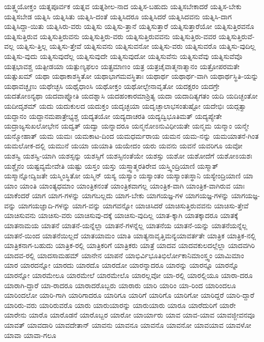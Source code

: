 {ಯತ್ತ್ವಯೋಕ್ತಂ
ಯತ್ನಪೂರ್ವಕ
ಯತ್ನವ
ಯತ್ನಶೀಲ-ನಾದ
ಯತ್ನಿಸ-ಬಹುದು
ಯತ್ನಿಸಬೇಕಾದರೆ
ಯತ್ನಿಸ-ಬೇಕು
ಯತ್ನಿಸಬೇಡ
ಯತ್ನಿಸಿ
ಯತ್ನಿಸಿತು
ಯತ್ನಿಸಿ-ದಂತೆ
ಯತ್ನಿಸಿದರೂ
ಯತ್ನಿಸಿದರೆ
ಯತ್ನಿಸಿದವನು
ಯತ್ನಿಸಿ-ದಾಗ
ಯತ್ನಿಸಿದ್ದಾ-ಯಿತು
ಯತ್ನಿಸಿರು-ವರು
ಯತ್ನಿಸು
ಯತ್ನಿಸು-ತ್ತಾನೆ
ಯತ್ನಿಸುತ್ತಾರೆ
ಯತ್ನಿಸುತ್ತಾರೆಯೋ
ಯತ್ನಿಸುತ್ತಿರವನೊ
ಯತ್ನಿಸುತ್ತಿರುವ
ಯತ್ನಿಸುತ್ತಿರುವನು
ಯತ್ನಿಸುತ್ತಿರು-ವರು
ಯತ್ನಿಸುತ್ತಿರುವವನು
ಯತ್ನಿಸುತ್ತಿರು-ವವರ
ಯತ್ನಿಸುತ್ತಿರುವೆ-ವಲ್ಲ
ಯತ್ನಿಸು-ತ್ತಿಲ್ಲ
ಯತ್ನಿಸು-ತ್ತೇವೆ
ಯತ್ನಿಸುವನು
ಯತ್ನಿಸುವನೋ
ಯತ್ನಿಸು-ವರು
ಯತ್ನಿಸುವರೊ
ಯತ್ನಿಸು-ವುದಿಲ್ಲ
ಯತ್ನಿಸು-ವುದು
ಯತ್ನಿಸುವುದೆಲ್ಲ
ಯತ್ನಿಸುವುದೇ
ಯತ್ನಿಸುವುದೋ
ಯತ್ನಿಸುವೆನು
ಯತ್ನಿಸುವೆವು
ಯತ್ನಿಸುವೆವೊ
ಯತ್ಪಭಾವಶ್ಚ
ಯತ್ಪೀಡಯಾ
ಯತ್ಪುಣ್ಯಫಲಂ
ಯತ್ಪ್ರಮಾಣಂ
ಯತ್ರ
ಯತ್ರಚೈವಾತ್ಮನಾತ್ಮಾನಂ
ಯತ್ರೋಪರಮತೇ
ಯತ್ಸುಖಮ್
ಯಥಾ
ಯಥಾಕಾಶಸ್ಥಿತೋ
ಯಥಾಭಾಗಮವಸ್ಥಿತಾಃ
ಯಥಾರ್ಥ
ಯಥಾರ್ಥ-ವಾಗಿ
ಯಥಾರ್ಥಸ್ಥಿತಿ-ಯನ್ನು
ಯಥಾವಚ್ಛೃಣು
ಯಥೇಚ್ಛಸಿ
ಯಥೈಧಾಂಸಿ
ಯಥೋಕ್ತಂ
ಯಥೋಲ್ಬೇನಾವೃತೋ
ಯದಕ್ಷರಂ
ಯದಗ್ರೇ
ಯದತೋಽನ್ಯಥಾ
ಯದವಾಪ್ನೋತಿ
ಯದಶ್ನಾಸಿ
ಯದಹಂಕಾರಮಾಶ್ರಿತ್ಯ
ಯದಾ
ಯದಾದಿತ್ಯಗತಂ
ಯದಿ
ಯದಿಚ್ಛಂತೋ
ಯದೀದೃಶಮ್
ಯದು
ಯದುಕುಲದ
ಯದುಕ್ತಂ
ಯದೃಚ್ಛಯಾ
ಯದೃಚ್ಛಾಲಾಭಸಂತುಷ್ಟೋ
ಯದೇಭಿಃ
ಯದ್ಗತ್ವಾ
ಯದ್ದಾನಂ
ಯದ್ದಾನಮಪಾತ್ರೇಭ್ಯಶ್ಚ
ಯದ್ಯತಯೋ
ಯದ್ಯದಾಚರತಿ
ಯದ್ಯದ್ವಿಭೂತಿಮತ್
ಯದ್ಯಪ್ಯೇತೇ
ಯದ್ರಾಜ್ಯಸುಖಲೋಭೇನ
ಯದ್ವತ್
ಯದ್ವಾ
ಯನ್ನಾದರೂ
ಯನ್ಮನೋಽನುವಿಧೀಯತೇ
ಯನ್ಮಮ
ಯನ್ಮಾಂ
ಯನ್ಮೇ
ಯನ್ಮೋಹಾತ್
ಯಮ
ಯಮಃ
ಯಮಕಾಟ-ದಿಂದ
ಯಮಧರ್ಮರಾಯ
ಯಮನ
ಯಮ-ನನ್ನು
ಯಮಯಾತನೆ-ಗಿಂತ
ಯಮಲೋಕ-ದಲ್ಲಿ
ಯಮುನೆ
ಯಯಾ
ಯಯಾತಿ
ಯಯೇದಂ
ಯರು
ಯವನು
ಯವನೆ
ಯವರಿಗೂ
ಯವೋ
ಯಶಸ್ವಿ
ಯಶಸ್ವಿ-ಯಾಗಿ
ಯಶಸ್ಸನ್ನು
ಯಶಸ್ಸಿಗೆ
ಯಶಸ್ಸಿನಂತೆಯೇ
ಯಶಸ್ಸು
ಯಶೋ
ಯಶೋದೆಗೆ
ಯಶೋಽಯಶಃ
ಯಶ್ಚೈನಂ
ಯಷ್ಟವ್ಯಮೇವೇತಿ
ಯಷ್ಟು
ಯಸ್ತಂ
ಯಸ್ತು
ಯಸ್ತ್ವಾತ್ಮರತಿರೇವ
ಯಸ್ತ್ವಿಂದ್ರಿಯಾಣಿ
ಯಸ್ಮಾತ್
ಯಸ್ಮಾನ್ನೋದ್ವಿಜತೇ
ಯಸ್ಮಿಂಸ್ಥಿತೋ
ಯಸ್ಮಿನ್
ಯಸ್ಯ
ಯಸ್ಯಾಂ
ಯಸ್ಯಾಂತಂ
ಯಸ್ಯಾಂತಃಸ್ಥಾನಿ
ಯಸ್ಯೇಂದ್ರಿಯಾಣಿ
ಯಾ
ಯಾಂ
ಯಾಂತಿ
ಯಾಂತ್ಯಧಮಾಂ
ಯಾಂತ್ರಿಕನಂತೆ
ಯಾಂತ್ರಿಕವಾಗಲ್ಲ
ಯಾಂತ್ರಿಕ-ವಾಗಿ
ಯಾಂತ್ರಿಕ-ವಾಗಿರುವ
ಯಾಃ
ಯಾಕೆಂದರೆ
ಯಾಗ
ಯಾಗ-ಗಳನ್ನು
ಯಾಗಬಲ್ಲದು
ಯಾಗ-ಬೇಕು
ಯಾಗಯಜ್ಞ-ಗಳ
ಯಾಗಯಜ್ಞ-ಗಳನ್ನು
ಯಾಗಯಜ್ಞ-ವನ್ನು
ಯಾಗಯಜ್ಞಾದಿ-ಗಳನ್ನು
ಯಾಗ-ವನ್ನು
ಯಾಗವನ್ನೋ
ಯಾಚಿಸಿದರೆ
ಯಾಚಿಸುತ್ತಿರುವವನು
ಯಾಚಿಸು-ತ್ತೇವೆ
ಯಾಚಿಸುವನು
ಯಾಚಿಸು-ವರು
ಯಾಚಿಸುವು-ದಕ್ಕೆ
ಯಾಚಿಸು-ವುದಿಲ್ಲ
ಯಾತ-ಕ್ಕಾಗಿ
ಯಾತಕ್ಕಾದರೂ
ಯಾತಕ್ಕೆ
ಯಾತನಾಮಯ
ಯಾತನೆ
ಯಾತನೆ-ಯನ್ನೆಲ್ಲಾ
ಯಾತನೆ-ಗಳನ್ನೆಲ್ಲ
ಯಾತನೆಯ
ಯಾತನೆ-ಯನ್ನು
ಯಾತನೆಯನ್ನೆಲ್ಲ
ಯಾತನೆ-ಯಿಂದ
ಯಾತನೆಯಿಲ್ಲದೆ
ಯಾತಯಾಮಂ
ಯಾತಿ
ಯಾತ್ಯನಾವೃತ್ತಿಮನ್ಯಯಾವರ್ತತೇ
ಯಾತ್ರಿಕ
ಯಾತ್ರಿಕ-ನಲ್ಲಿ
ಯಾತ್ರಿಕನಾಗ-ಬಹುದು
ಯಾತ್ರಿಕ-ರಲ್ಲಿ
ಯಾತ್ರಿಕರಿಗೆ
ಯಾತ್ರಿಕರು
ಯಾತ್ರೆ
ಯಾದವ
ಯಾದವಕುಲದಲ್ಲೆಲ್ಲಾ
ಯಾದವಗಿರಿ
ಯಾದವ-ರಲ್ಲಿ
ಯಾದಸಾಮಹಮ್
ಯಾನೇನ
ಯಾಪನೆ
ಯಾಭಿರ್ವಿಭೂತಿಭಿರ್ಲೋಕಾನಿಮಾಂಸ್ತ್ವಂ
ಯಾಮಿಮಾಂ
ಯಾರ
ಯಾರದನ್ನೋ
ಯಾರದು
ಯಾರದೊ
ಯಾರದೋ
ಯಾರನ್ನಾದರೂ
ಯಾರನ್ನು
ಯಾರನ್ನೂ
ಯಾರನ್ನೊ
ಯಾರನ್ನೋ
ಯಾರಮೇಲೂ
ಯಾರಮೇಲೆ
ಯಾರಮೇಲೊ
ಯಾರಲ್ಲವೋ
ಯಾ-ರಲ್ಲಿ
ಯಾರಲ್ಲಿಯೂ
ಯಾರಾ-ದರೂ
ಯಾರಾಗಿ-ದ್ದಾರೆ
ಯಾ-ರಾದರೂ
ಯಾರಾದರೊಬ್ಬರು
ಯಾರಾರು
ಯಾರಿ
ಯಾರಿಂ
ಯಾ-ರಿಂದ
ಯಾರಿಂದಲೂ
ಯಾರಿಂದಲೋ
ಯಾರಿ-ಗಾಗಿ
ಯಾರಿಗಾದರೂ
ಯಾರಿಗೂ
ಯಾರಿಗೆ
ಯಾರಿಗೊ
ಯಾರಿಗೋ
ಯಾರಿದ್ದರೆ
ಯಾರಿ-ದ್ದಾರೆ
ಯಾರಿರು-ವರು
ಯಾರಿರುವರೊ
ಯಾರು
ಯಾರುಯಾರನ್ನು
ಯಾರುಯಾರು
ಯಾರೂ
ಯಾರೆದುರಿಗೆ
ಯಾರೇ
ಯಾರೇನು
ಯಾರೊ
ಯಾರೊಡನೆ
ಯಾರೊಬ್ಬರ
ಯಾರೋ
ಯಾರ್ಯಾರು
ಯಾವ
ಯಾವ-ಯಾವ
ಯಾವಜ್ಜೀವನವೂ
ಯಾವತ್
ಯಾವದಾರಿ
ಯಾವದೇತಾನ್
ಯಾವನು
ಯಾವನೂ
ಯಾವನೊ
ಯಾವನೋ
ಯಾವಯಾವ
ಯಾವಳೋ
ಯಾವಾ
ಯಾವಾ-ಗಲೂ
}
